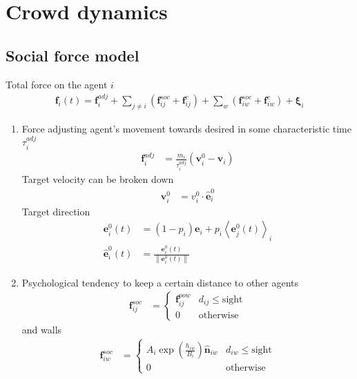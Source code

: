 \section{Crowd dynamics}
\subsection{Social force model}
Total force on the agent $ i $
\begin{align}
\mathbf{f}_{i}(t) = \mathbf{f}_{i}^{adj} + \sum_{j\neq i}^{} \left(\mathbf{f}_{ij}^{soc} + \mathbf{f}_{ij}^{c}\right) + \sum_{w}^{} \left(\mathbf{f}_{iw}^{soc} + \mathbf{f}_{iw}^{c}\right) + \boldsymbol{\xi}_{i}
\end{align}

\begin{enumerate}[label=\roman{enumi})]
\item 
Force adjusting agent's movement towards desired in some characteristic time $ \tau_{i}^{adj} $
\begin{align}
\mathbf{f}_{i}^{adj} &= \frac{m_{i}}{\tau_{i}^{adj}} (\mathbf{v}_{i}^{0} - \mathbf{v}_{i}) 
\end{align}
Target velocity can be broken down
\begin{align}
\mathbf{v}_{i}^{0} &= v_{i}^{0} \cdot \hat{\mathbf{e}}_{i}^{0}
\end{align}
Target direction
\begin{align}
\mathbf{e}_{i}^{0}(t) &= (1 - p_{i})\mathbf{e}_{i} + p_{i} \left\langle \mathbf{e}_{j}^{0}(t) \right\rangle_{i} \\
\hat{\mathbf{e}}_{i}^{0}(t) &= \frac{\mathbf{e}_{i}^{0}(t)}{\left\| \mathbf{e}_{i}^{0}(t) \right\|}
\end{align}

\item 
Psychological tendency to keep a certain distance to other agents
\begin{align}
\mathbf{f}_{ij}^{soc} &=
\begin{cases}
\mathbf{f}_{ij}^{pow} &  d_{ij} \leq \text{sight} \\
0 & \text{otherwise}
\end{cases}
\end{align}
and walls
\begin{align}
\mathbf{f}_{iw}^{soc} &=
\begin{cases}
A_{i} \exp\left(\frac{h_{iw}}{B_{i}}\right) \hat{\mathbf{n}}_{iw} &  d_{iw} \leq \text{sight} \\
0 & \text{otherwise}
\end{cases}
\end{align} 



\end{enumerate}
